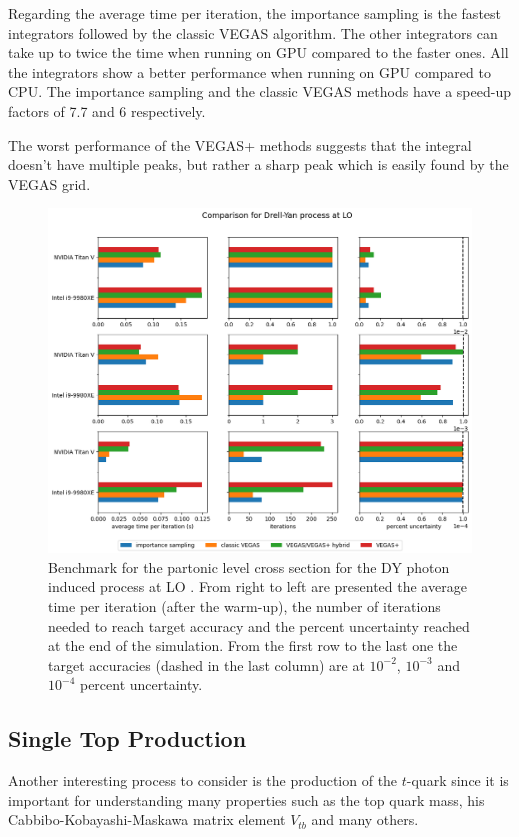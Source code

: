 \documentclass[../main/main.tex]{subfiles}
\begin{document}
Regarding the average time per iteration, the importance sampling is the fastest integrators followed by the classic VEGAS algorithm. The other integrators can take up to twice the time when running on GPU compared to the faster ones. All the integrators show a better performance when running on GPU compared to CPU. The importance sampling and the classic VEGAS methods have a speed-up factors of 7.7 and 6 respectively.

The worst performance of the VEGAS+ methods suggests that the integral doesn't have multiple peaks, but rather a sharp peak which is easily found by the VEGAS grid. 


\begin{figure}[]
	\centering
	\includegraphics[width=\textwidth]{../images/pineappl_final.png}
	\caption{Benchmark  for the partonic level cross section for the DY photon induced process  at LO \cite{Carrazza_2020}. From right to left are presented the average time per iteration (after the warm-up), the number of iterations needed to reach target accuracy and the percent uncertainty reached at the end of the simulation. From the first row to the last one the target accuracies (dashed in the last column) are at $10^{-2}$, $10^{-3}$ and $10^{-4}$ percent uncertainty.}
	\label{pineappl_plot}
\end{figure}





\subsection{Single Top Production}
\label{singletop_sect}
Another interesting process to consider is the production of the $t$-quark since it is important for understanding many properties such as the top quark mass, his  Cabbibo-Kobayashi-Maskawa matrix element $V_{tb}$ and many others.
\end{document}
